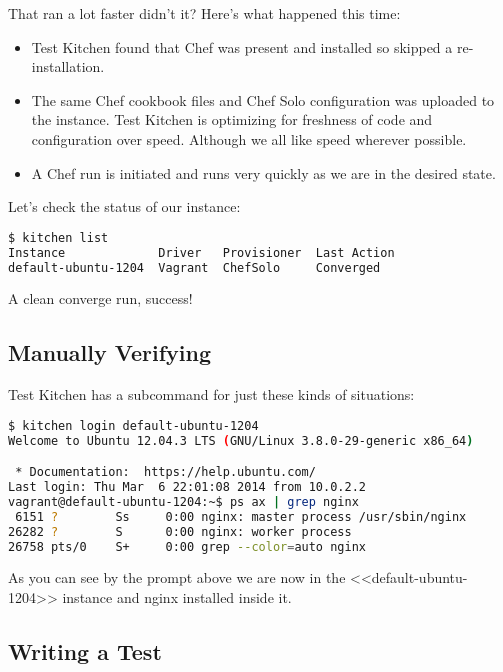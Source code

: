 That ran a lot faster didn't it? Here's what happened this time:

\begin{itemize}
  \item Test Kitchen found that Chef was present and installed so skipped a re-installation.
  \item The same Chef cookbook files and Chef Solo configuration was uploaded to the instance. Test Kitchen is optimizing for freshness of code and configuration over speed. Although we all like speed wherever possible.
  \item A Chef run is initiated and runs very quickly as we are in the desired state.
\end{itemize}

Let's check the status of our instance:

\begin{lstlisting}[language=Bash,label=lst:testing-test-kitchen11]
$ kitchen list
Instance             Driver   Provisioner  Last Action
default-ubuntu-1204  Vagrant  ChefSolo     Converged
\end{lstlisting}

A clean converge run, success!





\subsection{Manually Verifying}

Test Kitchen has a  subcommand for just these kinds of situations:

\begin{lstlisting}[language=Bash,label=lst:testing-test-kitchen12]
$ kitchen login default-ubuntu-1204
Welcome to Ubuntu 12.04.3 LTS (GNU/Linux 3.8.0-29-generic x86_64)

 * Documentation:  https://help.ubuntu.com/
Last login: Thu Mar  6 22:01:08 2014 from 10.0.2.2
vagrant@default-ubuntu-1204:~$ ps ax | grep nginx
 6151 ?        Ss     0:00 nginx: master process /usr/sbin/nginx
26282 ?        S      0:00 nginx: worker process
26758 pts/0    S+     0:00 grep --color=auto nginx
\end{lstlisting}

As you can see by the prompt above we are now in the <<default-ubuntu-1204>> instance and nginx installed inside it.




\subsection{Writing a Test}

